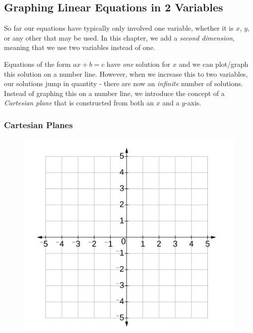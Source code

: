 \documentclass[addpoints,12pt]{exam}
\theoremstyle{definition}
\theoremstyle{break}
\theoremstyle{break}
\begin{document}
\setcounter{section}{3}
\setcounter{subsection}{0}

\subsection{Graphing Linear Equations in 2 Variables}

\vspace{.25in}

\noindent So far our equations have typically only involved one variable, whether it is $x$, $y$, or any other that may be used. In this chapter, we add a \emph{second dimension}, meaning that we use two variables instead of one.
\vspace{.15in}

\noindent Equations of the form $ax + b = c$ have \emph{one} solution for $x$ and we can plot/graph this solution on a number line. However, when we increase this to two variables, our solutions jump in quantity - there are now an \emph{infinite} number of solutions. Instead of graphing this on a number line, we introduce the concept of a \emph{Cartesian plane} that is constructed from both an $x$ and a $y$-axis.

\vspace{.15in}

\subsubsection*{Cartesian Planes}

\begin{figure}[h]
\centering
\includegraphics[scale=.75]{../images/cartesian_plane}
\end{figure}
\end{document}
